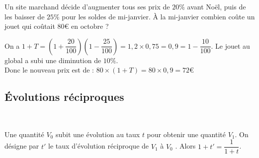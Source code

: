 \begin{Propriété}
\begin{itemize}[label=\textcolor{Couleur2}{$\bullet$}]
\begin{minipage}[c]{0.4\linewidth}
\begin{center}
\end{center}
\end{minipage}
\end{itemize}
\end{Propriété}

\begin{Exemple}
Un site marchand décide d'augmenter tous ses prix de $20 \%$ avant Noël, puis de les baisser de $25 \%$ pour les soldes de mi-janvier.
À la mi-janvier combien coûte un jouet qui coûtait $80$€ en octobre ? 

On a $1+T=\left(1+\dfrac{20}{100}\right)\left(1-\dfrac{25}{100}\right)=1,2\times 0,75=0,9=1-\dfrac{10}{100}$. Le jouet au global a subi une diminution de $10\%$. \\
Donc le nouveau prix est de : $80\times (1+T)=80\times 0,9= 72$€
\end{Exemple}

\subsection{Évolutions réciproques}

\begin{Propriété} $ $ \\
\begin{minipage}[c]{0.7\linewidth}
Une quantité $V_0$ subit une évolution au taux $t$ pour obtenir une quantité $V_1$. On désigne par $t'$ le taux d'évolution réciproque de $V_1$ à $V_0$ . Alors $1+t '=\dfrac{1}{1+t}$.
\end{minipage} \hfill
\begin{minipage}[c]{0.4\linewidth}
\begin{center}
\end{center}
\end{minipage}
\end{Propriété}

